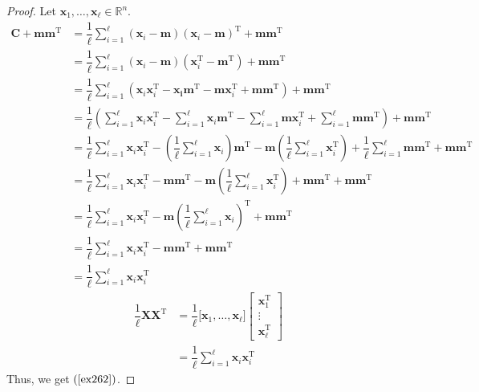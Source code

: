 \documentclass{article}
\theoremstyle{plain}
\begin{document}
\begin{proof}
	Let
	\begin{math}
		\bm{x}_1 , \ldots , \bm{x}_{\ell} \in \mathbb{R}^n .
	\end{math}
	\begin{equation*}
		\begin{split}
			\bm{C} + \bm{m} \bm{m}^\mathrm{T} &= \dfrac{1}{\ell} \sum_{i=1}^{\ell} (\bm{x}_i - \bm{m}) (\bm{x}_i - \bm{m})^\mathrm{T} + \bm{m} \bm{m}^\mathrm{T} \\
			&= \dfrac{1}{\ell} \sum_{i=1}^{\ell} (\bm{x}_i - \bm{m}) (\bm{x}_i^\mathrm{T} - \bm{m}^\mathrm{T}) + \bm{m} \bm{m}^\mathrm{T} \\
			&= \dfrac{1}{\ell} \sum_{i=1}^{\ell} (\bm{x}_i \bm{x}_i^\mathrm{T} - \bm{x_i} \bm{m}^\mathrm{T} - \bm{m} \bm{x}_i^\mathrm{T} + \bm{m} \bm{m}^\mathrm{T}) + \bm{m} \bm{m}^\mathrm{T} \\
			&= \dfrac{1}{\ell} \left( \sum_{i=1}^{\ell} \bm{x}_i \bm{x}_i^\mathrm{T} - \sum_{i=1}^\ell \bm{x}_i \bm{m}^\mathrm{T} - \sum_{i=1}^\ell \bm{m} \bm{x}_i^\mathrm{T} + \sum_{i=1}^\ell \bm{m} \bm{m}^\mathrm{T} \right) + \bm{m} \bm{m}^\mathrm{T} \\
			&= \dfrac{1}{\ell} \sum_{i=1}^{\ell} \bm{x}_i \bm{x}_i^\mathrm{T} - \left( \dfrac{1}{\ell} \sum_{i=1}^\ell \bm{x}_i \right) \bm{m}^\mathrm{T} - \bm{m} \left( \dfrac{1}{\ell} \sum_{i=1}^\ell \bm{x}_i^\mathrm{T} \right)
			+ \dfrac{1}{\ell} \sum_{i=1}^\ell \bm{m} \bm{m}^\mathrm{T} + \bm{m} \bm{m}^\mathrm{T} \\
			&= \dfrac{1}{\ell} \sum_{i=1}^{\ell} \bm{x}_i \bm{x}_i^\mathrm{T} - \bm{m} \bm{m}^\mathrm{T} - \bm{m} \left( \dfrac{1}{\ell} \sum_{i=1}^\ell \bm{x}_i^\mathrm{T} \right)
			+ \bm{m} \bm{m}^\mathrm{T} + \bm{m} \bm{m}^\mathrm{T} \\
			&= \dfrac{1}{\ell} \sum_{i=1}^{\ell} \bm{x}_i \bm{x}_i^\mathrm{T} - \bm{m} \left( \dfrac{1}{\ell} \sum_{i=1}^\ell \bm{x}_i \right)^\mathrm{T} + \bm{m} \bm{m}^\mathrm{T} \\
			&= \dfrac{1}{\ell} \sum_{i=1}^{\ell} \bm{x}_i \bm{x}_i^\mathrm{T} - \bm{m} \bm{m}^\mathrm{T} + \bm{m} \bm{m}^\mathrm{T} \\
			&= \dfrac{1}{\ell} \sum_{i=1}^{\ell} \bm{x}_i \bm{x}_i^\mathrm{T}
		\end{split}
	\end{equation*}
	\begin{equation*}
		\begin{split}
			\dfrac{1}{\ell} \bm{X} \bm{X}^\mathrm{T} &= \dfrac{1}{\ell} \lbrack \bm{x}_1 , \ldots , \bm{x}_{\ell} \rbrack
			\begin{bmatrix}
				\bm{x}_1^\mathrm{T} \\
				\vdots \\
				\bm{x}_{\ell}^\mathrm{T}
			\end{bmatrix} \\
			&= \dfrac{1}{\ell} \sum_{i=1}^{\ell} \bm{x}_i \bm{x}_i^\mathrm{T}
		\end{split}
	\end{equation*}
	Thus, we get $(\ref{ex262})$.
\end{proof}
\end{document}
